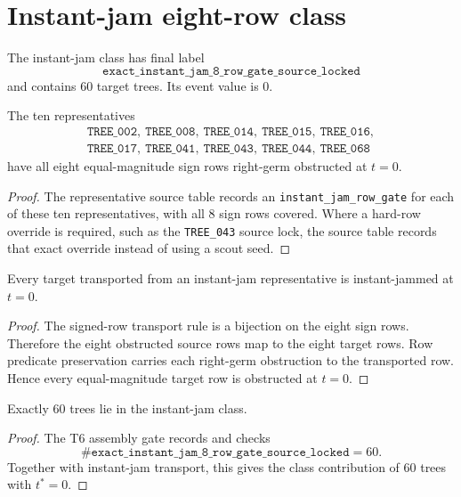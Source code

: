 
\section{Instant-jam eight-row class}

The instant-jam class has final label
\[
  \texttt{exact\_instant\_jam\_8\_row\_gate\_source\_locked}
\]
and contains 60 target trees.  Its event value is \(0\).

\begin{lemma}
The ten representatives
\[
\begin{gathered}
  \texttt{TREE\_002},\ \texttt{TREE\_008},\ \texttt{TREE\_014},\ \texttt{TREE\_015},\ \texttt{TREE\_016},\\
  \texttt{TREE\_017},\ \texttt{TREE\_041},\ \texttt{TREE\_043},\ \texttt{TREE\_044},\ \texttt{TREE\_068}
\end{gathered}
\]
have all eight equal-magnitude sign rows right-germ obstructed at \(t=0\).
\end{lemma}

\begin{proof}
The representative source table records an \texttt{instant\_jam\_row\_gate} for each of these ten representatives, with all 8 sign rows covered.  Where a hard-row override is required, such as the \texttt{TREE\_043} source lock, the source table records that exact override instead of using a scout seed.
\end{proof}

\begin{lemma}
Every target transported from an instant-jam representative is instant-jammed at \(t=0\).
\end{lemma}

\begin{proof}
The signed-row transport rule is a bijection on the eight sign rows.  Therefore the eight obstructed source rows map to the eight target rows.  Row predicate preservation carries each right-germ obstruction to the transported row.  Hence every equal-magnitude target row is obstructed at \(t=0\).
\end{proof}

\begin{proposition}
Exactly 60 trees lie in the instant-jam class.
\end{proposition}

\begin{proof}
The T6 assembly gate records and checks
\[
  \#\texttt{exact\_instant\_jam\_8\_row\_gate\_source\_locked}=60.
\]
Together with instant-jam transport, this gives the class contribution of 60 trees with \(t^*=0\).
\end{proof}
